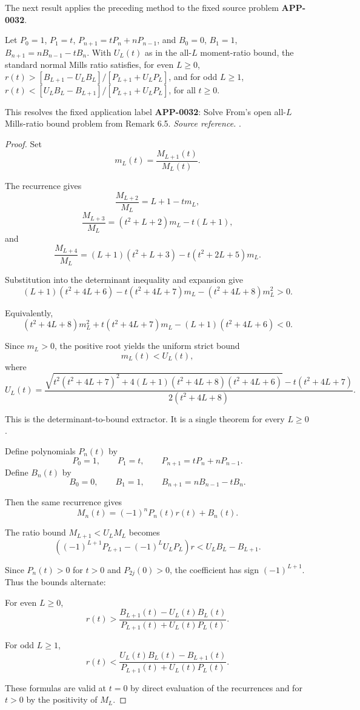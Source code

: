 The next result applies the preceding method to the fixed source problem \textbf{APP-0032}.
\begin{corollary}
\label{res:from-mills-all-l-alternating-r-bound-family}
Let \(P_0=1\), \(P_1=t\), \(P_{n+1}=tP_n+nP_{n-1}\), and \(B_0=0\), \(B_1=1\), \(B_{n+1}=nB_{n-1}-tB_n\). With \(U_L(t)\) as in the all-\(L\) moment-ratio bound, the standard normal Mills ratio satisfies, for even \(L\ge0\), \(r(t)>[B_{L+1}-U_LB_L]/[P_{L+1}+U_LP_L]\), and for odd \(L\ge1\), \(r(t)<[U_LB_L-B_{L+1}]/[P_{L+1}+U_LP_L]\), for all \(t\ge0\).

This resolves the fixed application label \textbf{APP-0032}: Solve From's open all-\(L\) Mills-ratio bound problem from Remark 6.5.
\emph{Source reference.} \cite{app-app-0032-source}.
\end{corollary}
\begin{proof}
Set
\[
m_L(t)=\frac{M_{L+1}(t)}{M_L(t)}.
\]

The recurrence gives
\[
\frac{M_{L+2}}{M_L}=L+1-tm_L,
\]
\[
\frac{M_{L+3}}{M_L}=(t^2+L+2)m_L-t(L+1),
\]
and
\[
\frac{M_{L+4}}{M_L}=(L+1)(t^2+L+3)-t(t^2+2L+5)m_L.
\]

Substitution into the determinant inequality and expansion give
\[
(L+1)(t^2+4L+6)-t(t^2+4L+7)m_L-(t^2+4L+8)m_L^2>0.
\]

Equivalently,
\[
(t^2+4L+8)m_L^2+t(t^2+4L+7)m_L-(L+1)(t^2+4L+6)<0.
\]

Since \(m_L>0\), the positive root yields the uniform strict bound
\[
m_L(t)<U_L(t),
\]
where
\[
U_L(t)=
\frac{
\sqrt{t^2(t^2+4L+7)^2+4(L+1)(t^2+4L+8)(t^2+4L+6)}
-t(t^2+4L+7)
}
{2(t^2+4L+8)}.
\]

This is the determinant-to-bound extractor. It is a single theorem for every \(L\ge0\).

Define polynomials \(P_n(t)\) by
\[
P_0=1,\qquad P_1=t,\qquad P_{n+1}=tP_n+nP_{n-1}.
\]
Define \(B_n(t)\) by
\[
B_0=0,\qquad B_1=1,\qquad B_{n+1}=nB_{n-1}-tB_n.
\]

Then the same recurrence gives
\[
M_n(t)=(-1)^nP_n(t)r(t)+B_n(t).
\]

The ratio bound \(M_{L+1}<U_LM_L\) becomes
\[
\left((-1)^{L+1}P_{L+1}-(-1)^L U_LP_L\right)r
<U_LB_L-B_{L+1}.
\]

Since \(P_n(t)>0\) for \(t>0\) and \(P_{2j}(0)>0\), the coefficient has sign \((-1)^{L+1}\). Thus the bounds alternate:

For even \(L\ge0\),
\[
r(t)>
\frac{B_{L+1}(t)-U_L(t)B_L(t)}
{P_{L+1}(t)+U_L(t)P_L(t)}.
\]

For odd \(L\ge1\),
\[
r(t)<
\frac{U_L(t)B_L(t)-B_{L+1}(t)}
{P_{L+1}(t)+U_L(t)P_L(t)}.
\]

These formulas are valid at \(t=0\) by direct evaluation of the recurrences and for \(t>0\) by the positivity of \(M_L\).
\end{proof}


